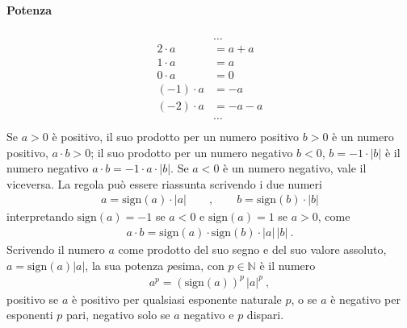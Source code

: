\documentclass[letterpaper,10pt,italian]{jupyterBook}
\begin{document}
\paragraph{Potenza}
\label{\detokenize{ch/set/numeric-sets:id3}}
\sphinxAtStartPar
{}
\begin{equation*}
\begin{split}\begin{aligned}
& \dots \\
 2   \cdot a & = a + a \\
 1   \cdot a & = a  \\
 0   \cdot a & = 0  \\
 (-1)\cdot a & = -a  \\
 (-2)\cdot a & = -a-a  \\
& \dots \\
\end{aligned}\end{split}
\end{equation*}
\sphinxAtStartPar
Se \(a > 0\) è positivo, il suo prodotto per un numero positivo \(b > 0\) è un numero positivo, \(a \cdot b > 0\); il suo prodotto per un numero negativo \(b < 0 \), \(b = -1 \cdot |b|\) è il numero negativo \(a \cdot b = - 1 \cdot a \cdot |b|\). Se \(a < 0\) è un numero negativo, vale il viceversa. La regola può essere riassunta scrivendo i due numeri
\begin{equation*}
\begin{split}a = \text{sign}(a) \cdot |a| \qquad , \qquad b = \text{sign}(b) \cdot |b|\end{split}
\end{equation*}
\sphinxAtStartPar
interpretando \(\text{sign}(a) = -1\) se \(a < 0\) e \(\text{sign}(a) = 1\) se \(a > 0\), come
\begin{equation*}
\begin{split}a \cdot b = \text{sign}(a) \cdot \text{sign}(b) \cdot |a| \, |b| \ .\end{split}
\end{equation*}
\sphinxAtStartPar
{} Scrivendo il numero \(a\) come prodotto del suo segno e del suo valore assoluto, \(a = \text{sign}(a) |a|\), la sua potenza \(p\)\sphinxhyphen{}esima, con \(p \in \mathbb{N}\) è il numero
\begin{equation*}
\begin{split}a^p = (\text{sign}(a))^p \, |a|^p \ ,\end{split}
\end{equation*}
\sphinxAtStartPar
positivo se \(a\) è positivo per qualsiasi esponente naturale \(p\), o se \(a\) è negativo per esponenti \(p\) pari, negativo solo se \(a\) negativo e \(p\) dispari.
\end{document}
